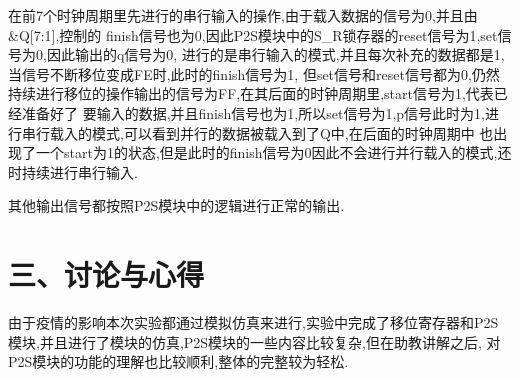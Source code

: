 \documentclass{article}
\begin{document}
在前7个时钟周期里先进行的串行输入的操作,由于载入数据的信号为0,并且由\&Q[7:1],控制的
finish信号也为0,因此P2S模块中的S\_R锁存器的reset信号为1,set信号为0,因此输出的q信号为0,
进行的是串行输入的模式,并且每次补充的数据都是1,当信号不断移位变成FE时,此时的finish信号为1,
但set信号和reset信号都为0,仍然持续进行移位的操作输出的信号为FF,在其后面的时钟周期里,start信号为1,代表已经准备好了
要输入的数据,并且finish信号也为1,所以set信号为1,p信号此时为1,进行串行载入的模式,可以看到并行的数据被载入到了Q中,在后面的时钟周期中
也出现了一个start为1的状态,但是此时的finish信号为0因此不会进行并行载入的模式,还时持续进行串行输入.

其他输出信号都按照P2S模块中的逻辑进行正常的输出.


\section*{三、讨论与心得}
由于疫情的影响本次实验都通过模拟仿真来进行,实验中完成了移位寄存器和P2S模块,并且进行了模块的仿真,P2S模块的一些内容比较复杂,但在助教讲解之后,
对P2S模块的功能的理解也比较顺利,整体的完整较为轻松.
\end{document}

